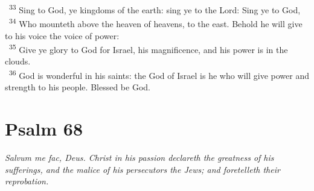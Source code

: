\documentclass[a5paper,12pt]{article}
\begin{document}
\begin{multicols*}{2}
~\textsuperscript{33} Sing to God, ye kingdoms of the earth: sing ye to the Lord: Sing ye to God,\\
~\textsuperscript{34} Who mounteth above the heaven of heavens, to the east. Behold he will give to his voice the voice of power:\\
~\textsuperscript{35} Give ye glory to God for Israel, his magnificence, and his power is in the clouds.\\
~\textsuperscript{36} God is wonderful in his saints: the God of Israel is he who will give power and strength to his people. Blessed be God.\\

\section{Psalm 68}
\label{sec:orgeb6e2e4}
\emph{Salvum me fac, Deus. Christ in his passion declareth the greatness of his sufferings, and the malice of his persecutors the Jews; and foretelleth their reprobation.}\\


\end{multicols*}
\end{document}
